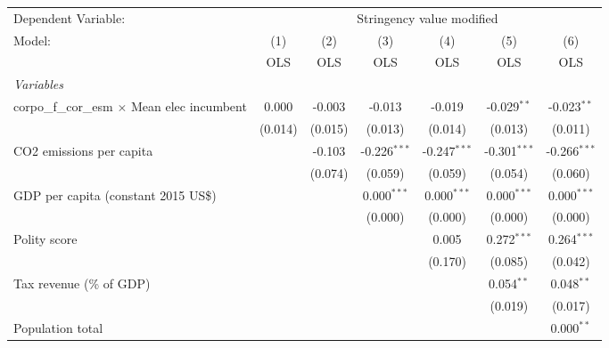 
\begingroup
\centering
\begin{tabular}{lcccccc}
   \toprule
   Dependent Variable: & \multicolumn{6}{c}{Stringency value modified}\\
   Model:                                              & (1)     & (2)     & (3)            & (4)            & (5)            & (6)\\  
                                                       &  OLS    & OLS     & OLS            & OLS            & OLS            & OLS\\  
   \midrule
   \emph{Variables}\\
   corpo\_f\_cor\_esm $\times$ Mean elec incumbent     & 0.000   & -0.003  & -0.013         & -0.019         & -0.029$^{**}$  & -0.023$^{**}$\\   
                                                       & (0.014) & (0.015) & (0.013)        & (0.014)        & (0.013)        & (0.011)\\   
   CO2 emissions per capita                            &         & -0.103  & -0.226$^{***}$ & -0.247$^{***}$ & -0.301$^{***}$ & -0.266$^{***}$\\   
                                                       &         & (0.074) & (0.059)        & (0.059)        & (0.054)        & (0.060)\\   
   GDP per capita (constant 2015 US\$)                 &         &         & 0.000$^{***}$  & 0.000$^{***}$  & 0.000$^{***}$  & 0.000$^{***}$\\   
                                                       &         &         & (0.000)        & (0.000)        & (0.000)        & (0.000)\\   
   Polity score                                        &         &         &                & 0.005          & 0.272$^{***}$  & 0.264$^{***}$\\   
                                                       &         &         &                & (0.170)        & (0.085)        & (0.042)\\   
   Tax revenue (\% of GDP)                             &         &         &                &                & 0.054$^{**}$   & 0.048$^{**}$\\   
                                                       &         &         &                &                & (0.019)        & (0.017)\\   
   Population total                                    &         &         &                &                &                & 0.000$^{**}$\\   

\end{tabular}

